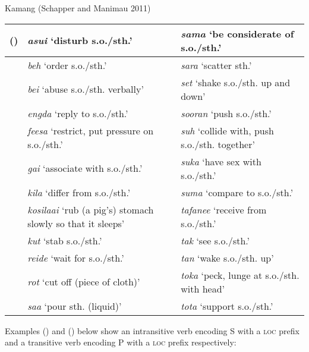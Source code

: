 Kamang (Schapper and Manimau 2011)

\begin{flushleft}
\tablehead{}
\begin{supertabular}{|m{0.43165985in}|m{3.0281599in}|m{2.67886in}|}
\hline
\label{bkm:Ref353454143}() &
\textit{asui} {\textquoteleft}disturb s.o./sth.{\textquoteright} &
\textit{sama} {\textquoteleft}be considerate of s.o./sth.{\textquoteright}\\\hline
 &
\textit{beh} {\textquoteleft}order s.o./sth.{\textquoteright} &
\textit{sara} {\textquoteleft}scatter sth.{\textquoteright}\\\hline
 &
\textit{bei} {\textquoteleft}abuse s.o./sth. verbally{\textquoteright} &
\textit{set} {\textquoteleft}shake s.o./sth. up and down{\textquoteright}\\\hline
 &
\textit{engda} {\textquoteleft}reply to s.o./sth.{\textquoteright} &
\textit{sooran} {\textquoteleft}push s.o./sth.{\textquoteright}\\\hline
 &
\textit{feesa} {\textquoteleft}restrict, put pressure on s.o./sth.{\textquoteright} &
\textit{suh} {\textquoteleft}collide with, push s.o./sth. together{\textquoteright}\\\hline
 &
\textit{gai} {\textquoteleft}associate with s.o./sth.{\textquoteright} &
\textit{suka} {\textquoteleft}have sex with s.o./sth.{\textquoteright} \\\hline
 &
\textit{kila} {\textquoteleft}differ from s.o./sth.{\textquoteright} &
\textit{suma} {\textquoteleft}compare to s.o./sth.{\textquoteright}\\\hline
 &
\textit{kosilaai} {\textquoteleft}rub (a pig{\textquoteright}s) stomach slowly so that it sleeps{\textquoteright} &
\textit{tafanee} {\textquoteleft}receive from s.o./sth.{\textquoteright}\\\hline
 &
\textit{kut} {\textquoteleft}stab s.o./sth.{\textquoteright} &
\textit{tak} {\textquoteleft}see s.o./sth.{\textquoteright}\\\hline
 &
\textit{reide} {\textquoteleft}wait for s.o./sth.{\textquoteright} &
\textit{tan} {\textquoteleft}wake s.o./sth. up{\textquoteright}\\\hline
 &
\textit{rot} {\textquoteleft}cut off (piece of cloth){\textquoteright} &
\textit{toka} {\textquoteleft}peck, lunge at s.o./sth. with head{\textquoteright}\\\hline
 &
\textit{saa} {\textquoteleft}pour sth. (liquid){\textquoteright} &
\textit{tota} {\textquoteleft}support s.o./sth.{\textquoteright}\\\hline
\end{supertabular}
\end{flushleft}
Examples () and () below show an intransitive verb encoding S with a \textsc{loc} prefix and a transitive verb encoding P with a \textsc{loc} prefix respectively:

